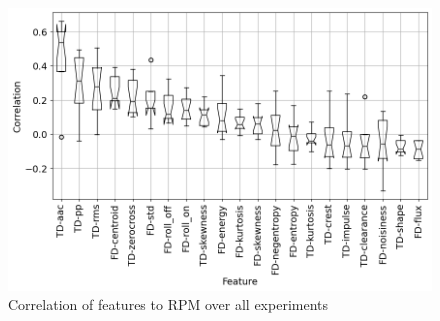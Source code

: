 
\begin{figure}[h]
    \centering
    \includegraphics[width=\textwidth]{assets/results/feature-values/corr-to-rpm.png}
    \caption{Correlation of features to RPM over all experiments}
\end{figure}

